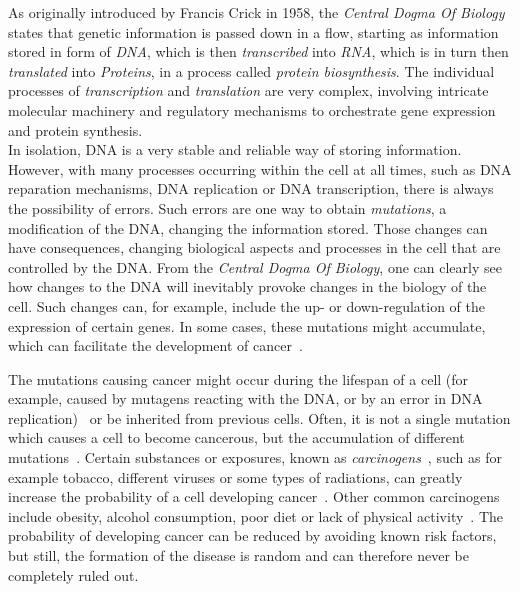As originally introduced by Francis Crick in 1958, the \textit{Central Dogma Of Biology} states that genetic information is passed down in a flow, starting as information stored in form of \emph{DNA}, which is then \emph{transcribed} into \emph{RNA}, which is in turn then \emph{translated} into \emph{Proteins}, in a process called \emph{protein biosynthesis}. The individual processes of \emph{transcription} and \emph{translation} are very complex, involving intricate molecular machinery and regulatory mechanisms to orchestrate gene expression and protein synthesis.\\
In isolation, DNA is a very stable and reliable way of storing information. However, with many processes occurring within the cell at all times, such as DNA reparation mechanisms, DNA replication or DNA transcription, there is always the possibility of errors. Such errors are one way to obtain \emph{mutations}, a modification of the DNA, changing the information stored. Those changes can have consequences, changing biological aspects and processes in the cell that are controlled by the DNA. From the \emph{Central Dogma Of Biology}, one can clearly see how changes to the DNA will inevitably provoke changes in the biology of the cell. Such changes can, for example, include the up- or down-regulation of the expression of certain genes. In some cases, these mutations might accumulate, which can facilitate the development of cancer~\cite{stem_cell_mutations}.

The mutations causing cancer might occur during the lifespan of a cell (for example, caused by mutagens reacting with the DNA, or by an error in DNA replication)~\cite{mutations} or be inherited from previous cells. Often, it is not a single mutation which causes a cell to become cancerous, but the accumulation of different mutations~\cite{stem_cell_mutations}. Certain substances or exposures, known as \textit{carcinogens}~\cite{carcinogens-def}, such as for example tobacco, different viruses or some types of radiations, can greatly increase the probability of a cell developing cancer~\cite{carcinogens}. Other common carcinogens include obesity, alcohol consumption, poor diet or lack of physical activity~\cite{carcinogens,carcinogens-def}. The probability of developing cancer can be reduced by avoiding known risk factors, but still, the formation of the disease is random and can therefore never be completely ruled out.

